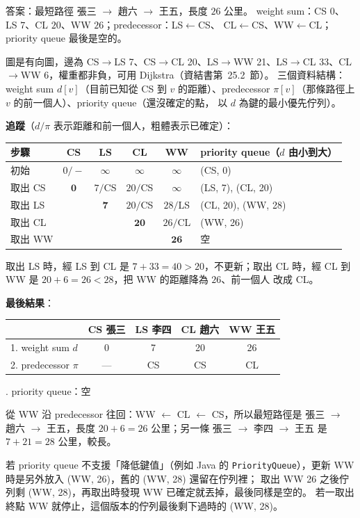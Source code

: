 \begin{pastsoln}
答案：最短路徑 張三 $\to$ 趙六 $\to$ 王五，長度 $26$ 公里。 weight sum：CS $0$、LS $7$、CL $20$、WW $26$；predecessor：LS$\gets$CS、
CL$\gets$CS、WW$\gets$CL；priority queue 最後是空的。

圖是有向圖，邊為 CS$\to$LS 7、CS$\to$CL 20、LS$\to$WW 21、LS$\to$CL 33、CL$\to$WW 6，權重都非負，可用 Dijkstra（資結書第~25.2~節）。
三個資料結構：weight sum $d[v]$（目前已知從 CS 到 $v$ 的距離）、predecessor $\pi[v]$（那條路徑上 $v$ 的前一個人）、priority queue（還沒確定的點，
以 $d$ 為鍵的最小優先佇列）。

\textbf{追蹤}（$d/\pi$ 表示距離和前一個人，粗體表示已確定）：
\begin{center}
\small
\begin{tabular}{lccccl}
\toprule
步驟 & CS & LS & CL & WW & priority queue（$d$ 由小到大） \\
\midrule
初始 & $0/-$ & $\infty$ & $\infty$ & $\infty$ & (CS, 0) \\
取出 CS & $\mathbf{0}$ & $7/$CS & $20/$CS & $\infty$ & (LS, 7), (CL, 20) \\
取出 LS & & $\mathbf{7}$ & $20/$CS & $28/$LS & (CL, 20), (WW, 28) \\
取出 CL & & & $\mathbf{20}$ & $26/$CL & (WW, 26) \\
取出 WW & & & & $\mathbf{26}$ & 空 \\
\bottomrule
\end{tabular}
\end{center}
取出 LS 時，經 LS 到 CL 是 $7 + 33 = 40 > 20$，不更新；取出 CL 時，經 CL 到 WW 是 $20 + 6 = 26 < 28$，把 WW 的距離降為 $26$、前一個人
改成 CL。

\textbf{最後結果}：
\begin{center}
\begin{tabular}{lcccc}
\toprule
 & CS 張三 & LS 李四 & CL 趙六 & WW 王五 \\
\midrule
1. weight sum $d$ & 0 & 7 & 20 & 26 \\
2. predecessor $\pi$ & — & CS & CS & CL \\
\bottomrule
\end{tabular}
. priority queue：空
\end{center}
從 WW 沿 predecessor 往回：WW $\gets$ CL $\gets$ CS，所以最短路徑是 張三 $\to$ 趙六 $\to$ 王五，長度 $20 + 6 = 26$ 公里；另一條
張三 $\to$ 李四 $\to$ 王五 是 $7 + 21 = 28$ 公里，較長。

若 priority queue 不支援「降低鍵值」（例如 Java 的 \texttt{PriorityQueue}），更新 WW 時是另外放入 (WW, 26)，舊的 (WW, 28) 還留在佇列裡；
取出 WW 26 之後佇列剩 (WW, 28)，再取出時發現 WW 已確定就丟掉，最後同樣是空的。 若一取出終點 WW 就停止，這個版本的佇列最後剩下過時的
(WW, 28)。
\end{pastsoln}
